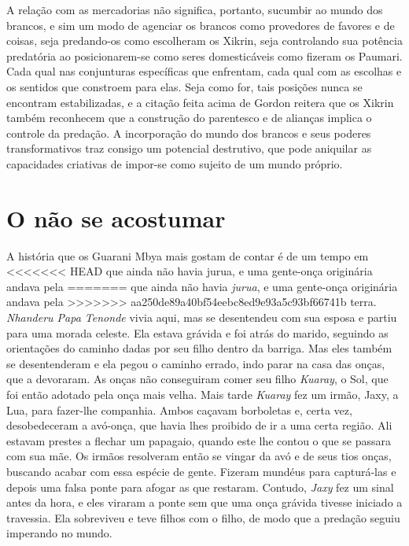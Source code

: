 {A relação com as mercadorias não significa, portanto, sucumbir ao mundo
dos brancos, e sim um modo de agenciar os brancos como provedores de
favores e de coisas, seja predando-os como escolheram os Xikrin, seja
controlando sua potência predatória ao posicionarem-se como seres
domesticáveis como fizeram os Paumari. Cada qual nas conjunturas
específicas que enfrentam, cada qual com as escolhas e os sentidos que
constroem para elas. Seja como for, tais posições nunca se encontram
estabilizadas, e a citação feita acima de Gordon reitera que os Xikrin
também reconhecem que a construção do parentesco e de alianças implica
o controle da predação. A incorporação do mundo dos brancos e seus
poderes transformativos traz consigo um potencial destrutivo, que pode
aniquilar as capacidades criativas de impor-se como sujeito de um mundo
próprio.

\section{O não se acostumar}

A história que os Guarani Mbya mais gostam de contar é de um tempo em
<<<<<<< HEAD
que ainda não havia jurua, e uma gente-onça originária andava pela
=======
que ainda não havia \emph{jurua}, e uma gente-onça originária andava pela
>>>>>>> aa250de89a40bf54eebc8ed9e93a5c93bf66741b
terra. \emph{Nhanderu Papa Tenonde} vivia aqui, mas se desentendeu com sua
esposa e partiu para uma morada celeste. Ela estava grávida e foi atrás
do marido, seguindo as orientações do caminho dadas por seu filho
dentro da barriga. Mas eles também se desentenderam e ela pegou o
caminho errado, indo parar na casa das onças, que a devoraram. As onças
não conseguiram comer seu filho \emph{Kuaray}, o Sol, que foi então adotado
pela onça mais velha. Mais tarde \emph{Kuaray} fez um irmão, Jaxy, a Lua, para
fazer-lhe companhia. Ambos caçavam borboletas e, certa vez,
desobedeceram a avó-onça, que havia lhes proibido de ir a uma certa
região. Ali estavam prestes a flechar um papagaio, quando este lhe
contou o que se passara com sua mãe. Os irmãos resolveram então se
vingar da avó e de seus tios onças, buscando acabar com essa espécie de
gente. Fizeram mundéus para capturá-las e depois uma falsa ponte para
afogar as que restaram. Contudo, \emph{Jaxy} fez um sinal antes da hora, e
eles viraram a ponte sem que uma onça grávida tivesse iniciado a
travessia. Ela sobreviveu e teve filhos com o filho, de modo que a
predação seguiu imperando no mundo.

}
